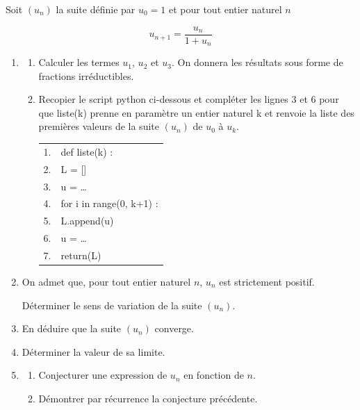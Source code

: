 \medskip

Soit $\left(u_n\right)$ la suite définie par $u_0 = 1$ et pour tout entier naturel $n$

\[u_{n+1} = \dfrac{u_n}{1 + u_n}\]

\begin{enumerate}
\item 
	\begin{enumerate}
		\item Calculer les termes $u_1$, $u_2$  et $u_3$. On  donnera les résultats sous forme de fractions irréductibles.
		\item Recopier le script python ci-dessous et compléter les lignes 3 et 6 pour que liste(k) prenne en paramètre un entier naturel k et renvoie la liste des premières valeurs de la suite $\left(u_n\right)$ de $u_0$ à $u_k$.

\begin{center}
\begin{tabularx}{0.5\linewidth}{|l|X|}\hline
1.&def liste(k) :\\
2.&\qquad L = []\\
3.&\qquad u = \ldots\\
4.&\qquad for i in range(0, k+1) :\\
5.&\quad \qquad L.append(u)\\
6.&\quad \qquad u = \ldots\\
7.&\qquad return(L)\\ \hline
\end{tabularx}
\end{center}
	\end{enumerate}
\item On admet que, pour tout entier naturel $n$, $u_n$ est strictement positif.

Déterminer le sens de variation de la suite $\left(u_n\right)$.
\item En déduire que la suite $\left(u_n\right)$ converge.
\item Déterminer la valeur de sa limite.
\item 
	\begin{enumerate}
		\item Conjecturer une expression de $u_n$ en fonction de $n$.
		\item Démontrer par récurrence la conjecture précédente.
	\end{enumerate}
\end{enumerate}

\bigskip
